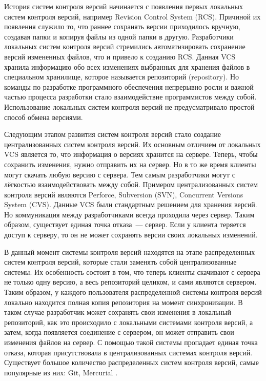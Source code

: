 История систем контроля версий начинается с появления первых локальных систем контроля версий, например Revision Control System (RCS). Причиной их появления служило то, что раннее сохранять версии приходилось вручную, создавая папки и копируя файлы из одной папки в другую. Разработчики локальных систем контроля версий стремились автоматизировать сохранение версий измененных файлов, что и привело к созданию RCS. Данная VCS хранила информацию обо всех изменениях выбранных для хранения файлов в специальном хранилище, которое называется репозиторий (repository). Но команды по разработке программного обеспечения непрерывно росли и важной частью процесса разработки стало взаимодействие программистов между собой. Использование локальных систем контроля версий не предусматривало простой способ обмена версиями.

Следующим этапом развития систем контроля версий стало создание централизованных систем контроля версий. Их основным отличием от локальных VCS является то, что информация о версиях хранится на сервере. Теперь, чтобы сохранить изменения, нужно отправить их на сервер. Но в то же время клиенты могут скачать любую версию с сервера. Тем самым разработчики могут с лёгкостью взаимодействовать между собой. Примером централизованных систем контроля версий являются Perforce, Subversion (SVN), Concurrent Versions System (CVS). Данные VCS были стандартным решением для хранения версий. Но коммуникация между разработчиками всегда проходила через сервер. Таким образом, существует единая точка отказа~--- сервер. Если у клиента теряется доступ к серверу, то он не может сохранять версии своих локальных изменений.

В данный момент системы контроля версий находятся на этапе распределенных систем контроля версий, которые стали заменять собой централизованные системы. Их особенность состоит в том, что теперь клиенты скачивают с сервера не только одну версию, а весь репозиторий целиком, и сами являются сервером. Таким образом, у каждого пользователя распределенной системы контроля версий локально находится полная копия репозитория на момент синхронизации. В таком случае разработчик может сохранять свои изменения в локальный репозиторий, как это происходило с локальными системами контроля версий, а затем, когда появляется соединение с сервером, он может отправить свои изменения файлов на сервер. С помощью такой системы пропадает единая точка отказа, которая присутствовала в централизованных системах контроля версий. Существует большое количество распределенных систем контроля версий, самые популярные из них: Git, Mercurial \cite{best-vcs}. 

